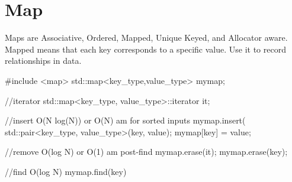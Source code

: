 \section{Map}
Maps are Associative, Ordered, Mapped, Unique Keyed, and Allocator aware\cite{cplusplus}.  Mapped means that each key corresponds to a specific value. Use it to record relationships in data.
\begin{code}
    #include <map>
    std::map<key_type,value_type> mymap;

    //iterator
    std::map<key_type, value_type>::iterator it;

    //insert O(N log(N)) or O(N) am for sorted inputs
    mymap.insert( std::pair<key_type, value_type>(key, value);
    mymap[key] = value;

    //remove O(log N) or O(1) am post-find
    mymap.erase(it);
    mymap.erase(key);

    //find O(log N)
    mymap.find(key)
\end{code}

